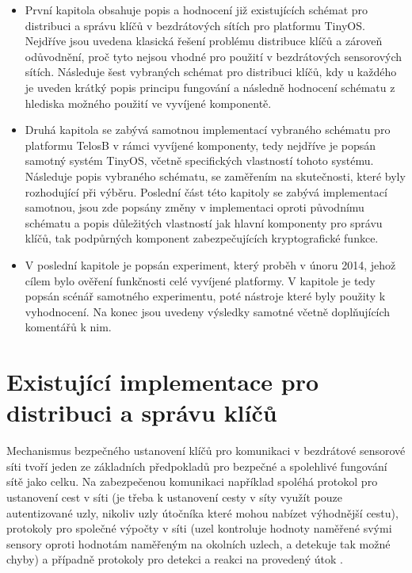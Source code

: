 \documentclass[11pt,final,twoside]{fithesis2}
\begin{document}
\begin {itemize}
\item První kapitola obsahuje popis a hodnocení již existujících schémat pro distribuci a správu klíčů v bezdrátových sítích pro platformu TinyOS. Nejdříve jsou uvedena klasická řešení problému distribuce 
klíčů a zároveň odůvodnění, proč tyto nejsou vhodné pro použití v bezdrátových sensorových sítích. Následuje šest vybraných schémat pro distribuci klíčů, kdy u každého je uveden krátký popis principu 
fungování a následně hodnocení schématu z hlediska možného použití ve vyvíjené komponentě. 

\item Druhá kapitola se zabývá samotnou implementací vybraného schématu pro platformu TelosB v rámci vyvíjené komponenty, tedy nejdříve je popsán samotný systém TinyOS, včetně specifických vlastností tohoto 
systému. Následuje popis vybraného schématu, se zaměřením na skutečnosti, které byly rozhodující při výběru. Poslední část této kapitoly se zabývá implementací samotnou, jsou zde popsány změny v implementaci 
oproti původnímu schématu a popis důležitých vlastností jak hlavní komponenty pro správu klíčů, tak podpůrných komponent zabezpečujících kryptografické funkce. 

\item V poslední kapitole je popsán experiment, který proběh v únoru 2014, jehož cílem bylo ověření funkčnosti celé vyvíjené platformy. V kapitole je tedy popsán scénář samotného experimentu, poté nástroje 
které byly použity k vyhodnocení. Na konec jsou uvedeny výsledky samotné včetně doplňujících komentářů k nim. 
\end{itemize}



\chapter{Existující implementace pro distribuci a správu klíčů}
Mechanismus bezpečného ustanovení klíčů pro komunikaci v bezdrátové sensorové síti tvoří jeden ze základních předpokladů 
pro bezpečné a spolehlivé fungování sítě jako celku. Na zabezpečenou komunikaci například spoléhá protokol pro ustanovení cest v síti (je třeba k ustanovení cesty v síty využít
pouze autentizované uzly, nikoliv uzly útočníka které mohou nabízet výhodnější cestu), protokoly pro společné výpočty v síti (uzel kontroluje hodnoty naměřené svými sensory oproti
hodnotám naměřeným na okolních uzlech, a detekuje tak možné chyby) a případně protokoly pro detekci a reakci na provedený útok \cite{Alcaraz2012}.
\end{document}
